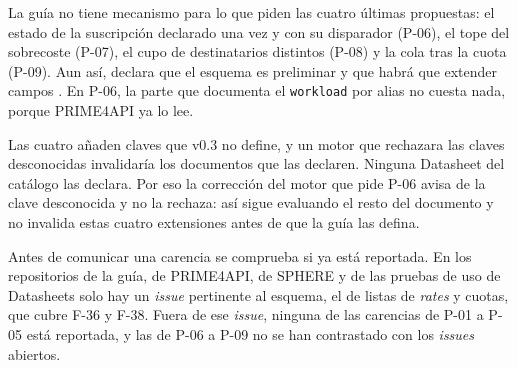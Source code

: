 La guía no tiene mecanismo para lo que piden las cuatro últimas propuestas: el estado de la suscripción declarado una vez y con su disparador (P-06), el tope del sobrecoste (P-07), el cupo de destinatarios distintos (P-08) y la cola tras la cuota (P-09).
Aun así, declara que el esquema es preliminar y que habrá que extender campos \citep{apisconsumptionmodel}.
En P-06, la parte que documenta el \texttt{workload} por alias no cuesta nada, porque PRIME4API ya lo lee.

Las cuatro añaden claves que v0.3 no define, y un motor que rechazara las claves desconocidas invalidaría los documentos que las declaren.
Ninguna Datasheet del catálogo las declara.
Por eso la corrección del motor que pide P-06 avisa de la clave desconocida y no la rechaza: así sigue evaluando el resto del documento y no invalida estas cuatro extensiones antes de que la guía las defina.

Antes de comunicar una carencia se comprueba si ya está reportada.
En los repositorios de la guía, de PRIME4API, de SPHERE y de las pruebas de uso de Datasheets solo hay un \textit{issue} pertinente al esquema, el de listas de \textit{rates} y cuotas, que cubre F-36 y F-38.
Fuera de ese \textit{issue}, ninguna de las carencias de P-01 a P-05 está reportada, y las de P-06 a P-09 no se han contrastado con los \textit{issues} abiertos.
